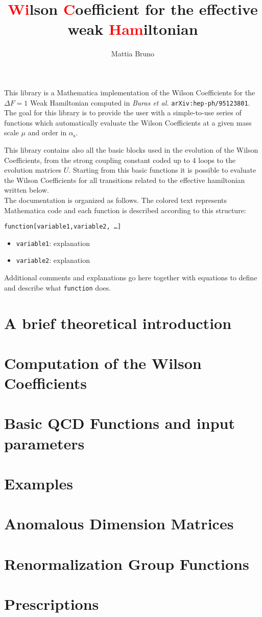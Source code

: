 \documentclass[a4paper]{scrartcl}
\title{\textcolor{red}{Wi}lson \textcolor{red}{C}oefficient for the effective weak \textcolor{red}{Ham}iltonian}
\author{Mattia Bruno}
\newcommand{\as}{\alpha_{\mathrm s}}
\newcommand{\code}[1]{\noindent\textcolor{RedOrange}{\texttt{#1}}}
\begin{document}
\maketitle

This library is a Mathematica implementation of the Wilson Coefficients 
for the $\Delta F=1$ Weak Hamiltonian computed in \textit{Buras et al.} 
\texttt{arXiv:hep-ph/95123801}.
The goal for this library is to provide the user with a simple-to-use 
series of functions which automatically evaluate the Wilson Coefficients 
at a given mass scale $\mu$ and order in $\as$.

This library contains also all the basic blocks used in the evolution of the 
Wilson Coefficients, from the strong coupling constant coded up to 4 loops to the 
evolution matrices $U$. Starting from this basic functions it is possible to 
evaluate the Wilson Coefficients for all transitions related to the effective
hamiltonian written below.\\

The documentation is organized as follows. The colored text represents 
Mathematica code and each function is described according to this structure:

\hrulefill

\code{function[variable1,variable2, \ldots]}\\
\begin{itemize}
\item \code{variable1}: explanation
\item \code{variable2}: explanation
\end{itemize}

Additional comments and explanations go here together with
equations to define and describe what \code{function} does.

\newpage
\section{A brief theoretical introduction}


\newpage
\section{Computation of the Wilson Coefficients}


\newpage
\section{Basic QCD Functions and input parameters}


\newpage
\section{Examples}


\newpage
\section{Anomalous Dimension Matrices}


\section{Renormalization Group Functions}


\section{Prescriptions}

\end{document}
